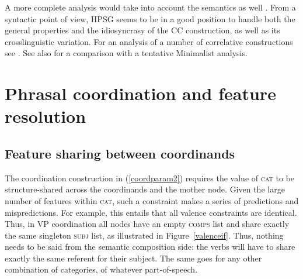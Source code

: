 \documentclass[output=paper
                ,modfonts
                ,nonflat
	        ,collection
	        ,collectionchapter
	        ,collectiontoclongg
 	        ,biblatex
                ,babelshorthands
                ,newtxmath
                ,draftmode
                ,colorlinks, citecolor=brown
]{./langsci/langscibook}
\begin{document}
{A more complete analysis would take into account the semantics as well \citep[Section~5.5]{fgsag08}. From a syntactic point of view, HPSG seems to be in a good position to handle both the general properties and the idiosyncrasy of the CC construction, as well as its crosslinguistic variation. 
For an analysis of a number of  correlative constructions see \citet{Alqurashi:Borsley:14}.
See also  \citet{Borsley:11} for a comparison with a tentative Minimalist analysis.


\section{Phrasal coordination and feature resolution}

\subsection{Feature sharing between coordinands}

The coordination construction in (\ref{coordparam2}) requires the value of \textsc{cat} to be structure-shared across the coordinands and the mother node. Given the large number of features within \textsc{cat}, such a constraint makes a series of predictions and mispredictions.
For example, this entails that all valence constraints are identical. Thus, in VP coordination all nodes have an empty \textsc{comps} list and share exactly the same singleton \textsc{subj} list, as illustrated in Figure~\ref{valenceif}. Thus, nothing needs to be said from the semantic composition side: the verbs will have to share exactly the same referent for their subject. The same goes for any other combination of categories, of whatever part-of-speech.

}
\end{document}
